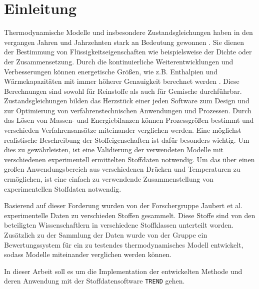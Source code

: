 \documentclass[../thesis.tex]{subfiles}
\begin{document}
\chapter{Einleitung}
\label{chp:Motivation}
Thermodynamische Modelle und insbesondere Zustandsgleichungen haben in den vergangen Jahren und Jahrzehnten stark an Bedeutung gewonnen \cite{ahlers2002development, stacey2000k}. Sie dienen der Bestimmung von Flüssigkeitseigenschaften wie beispielsweise der Dichte oder der Zusammensetzung. Durch die kontinuierliche Weiterentwicklungen und Verbesserungen können energetische Größen, wie z.B. Enthalpien und Wärmekapazitäten mit immer höherer Genauigkeit berechnet werden \cite{chen2002modification}. Diese Berechnungen sind sowohl für Reinstoffe als auch für Gemische durchführbar.
Zustandsgleichungen bilden das Herzstück einer jeden Software zum Design und zur Optimierung von verfahrenstechnischen Anwendungen und Prozessen. Durch das Lösen von Massen- und Energiebilanzen können Prozessgrößen bestimmt und verschieden Verfahrensansätze miteinander verglichen werden. Eine möglichst realistische Beschreibung der Stoffeigenschaften ist dafür besonders wichtig. Um dies zu gewährleisten, ist eine Validierung der verwendeten Modelle mit verschiedenen experimentell ermittelten Stoffdaten notwendig. Um das über einen großen Anwendungsbereich aus verschiedenen Drücken und Temperaturen zu ermöglichen, ist eine einfach zu verwendende Zusammenstellung von experimentellen Stoffdaten notwendig.

Basierend auf dieser Forderung wurden von der Forschergruppe Jaubert et al. \cite{jaubert2020benchmark} experimentelle Daten zu verschieden Stoffen gesammelt. Diese Stoffe sind von den beteiligten Wissenschaftlern in verschiedene Stoffklassen unterteilt worden. Zusätzlich zu der Sammlung der Daten wurde von der Gruppe ein Bewertungssystem für ein zu testendes thermodynamisches Modell entwickelt, sodass Modelle miteinander verglichen werden können.

In dieser Arbeit soll es um die Implementation der entwickelten Methode und deren Anwendung mit der Stoffdatensoftware \texttt{TREND} gehen.
\end{document}
